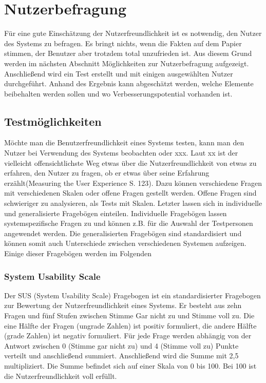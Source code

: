 \section{Nutzerbefragung}
Für eine gute Einschätzung der Nutzerfreundlichkeit ist es notwendig, den Nutzer des Systems zu befragen. Es bringt nichts, wenn die Fakten auf dem Papier stimmen, der Benutzer aber trotzdem total unzufrieden ist. Aus diesem Grund werden im nächsten Abschnitt Möglichkeiten zur Nutzerbefragung aufgezeigt. Anschließend wird ein Test erstellt und mit einigen ausgewählten Nutzer durchgeführt. Anhand des Ergebnis kann abgeschätzt werden, welche Elemente beibehalten werden sollen und wo Verbesserungspotential vorhanden ist.

\subsection{Testmöglichkeiten}
Möchte man die Benutzerfreundlichkeit eines Systems testen, kann man den Nutzer bei Verwendung des Systems beobachten oder xxx. Laut xx ist \glqq der vielleicht offensichtlichste Weg etwas über die Nutzerfreundlichkeit von etwas zu erfahren, den Nutzer zu fragen, ob er etwas über seine Erfahrung erzählt\grqq(Measuring the User Experience S. 123). Dazu können verschiedene Fragen mit verschiedenen Skalen oder offene Fragen gestellt werden. Offene Fragen sind schwieriger zu analysieren, als Tests mit Skalen. Letzter lassen sich in individuelle und generalisierte Fragebögen einteilen. Individuelle Fragebögen lassen systemspezifische Fragen zu und können z.B. für die Auswahl der Testpersonen angewendet werden. Die generalisierten Fragebögen sind standardisiert und können somit auch Unterschiede zwischen verschiedenen Systemen aufzeigen. Einige dieser Fragebögen werden im Folgenden

\subsubsection*{System Usability Scale}
Der SUS (System Usability Scale) Fragebogen ist ein standardisierter Fragebogen zur Bewertung der Nutzerfreundlichkeit eines Systems. Er besteht aus zehn Fragen und fünf Stufen zwischen Stimme Gar nicht zu und Stimme voll zu. Die eine Hälfte der Fragen (ungrade Zahlen) ist positiv formuliert, die andere Hälfte (grade Zahlen) ist negativ formuliert. Für jede Frage werden abhängig von der Antwort zwischen 0 (Stimme gar nicht zu) und 4 (Stimme voll zu) Punkte verteilt und anschließend summiert. Anschließend wird die Summe mit 2,5 multipliziert. Die Summe befindet sich auf einer Skala von 0 bis 100. Bei 100 ist die Nutzerfreundlichkeit voll erfüllt. 

